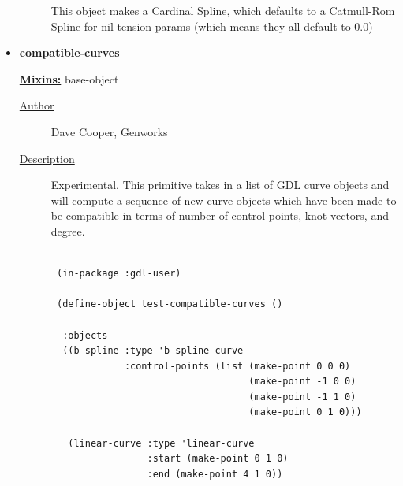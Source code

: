 \documentclass [11pt]{book}
\begin{document}
\begin{itemize}
\begin{description}
This object makes a Cardinal Spline, which defaults to a Catmull-Rom Spline for nil tension-params (which means they all default to 0.0)



\end{description}









\item {}
\label{prim:compatible-curves}
\textbf{compatible-curves}


\textbf{
\underline{Mixins:}} base-object





\begin{description}

\item [
\underline{Author}]


Dave Cooper, Genworks



\item [
\underline{Description}]


Experimental. This primitive takes in a list of GDL 
curve objects and will compute a sequence of new curve objects which have been made 
to be compatible in terms of number of control points, knot vectors, and degree.



\end{description}




\begin{figure}
\begin{lrbox}{\boxedverb}
\begin{minipage}{\linewidth}
{\small

\begin{verbatim}
 
 (in-package :gdl-user)

 (define-object test-compatible-curves ()
  
  :objects
  ((b-spline :type 'b-spline-curve
             :control-points (list (make-point 0 0 0)
                                   (make-point -1 0 0)
                                   (make-point -1 1 0)
                                   (make-point 0 1 0)))
   
   (linear-curve :type 'linear-curve
                 :start (make-point 0 1 0)
                 :end (make-point 4 1 0))
   

\end{verbatim}}
\end{minipage}
\end{lrbox}
\end{figure}
\end{itemize}
\end{document}
